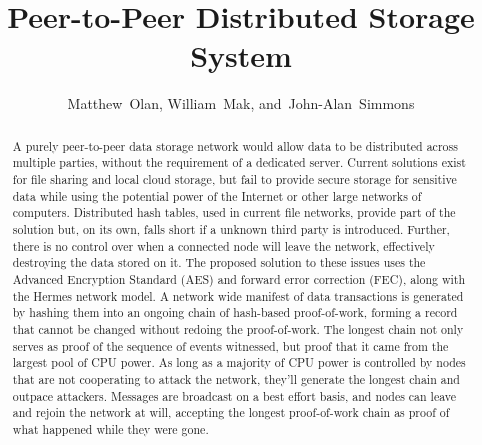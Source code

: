 \documentclass[journal]{IEEEtran}
\begin{document}
\title{Peer-to-Peer Distributed Storage System}

\author{
        Matthew~Olan, %
        William~Mak,
        and~John-Alan~Simmons
}


\maketitle

\begin{abstract} %
A purely peer-to-peer data storage network would allow data to be distributed across multiple parties, without the requirement of a dedicated server. Current solutions exist for file sharing and local cloud storage, but fail to provide secure storage for sensitive data while using the potential power of the Internet or other large networks of computers. Distributed hash tables, used in current file networks, provide part of the solution but, on its own, falls short if a unknown third party is introduced. Further, there is no control over when a connected node will leave the network, effectively destroying the data stored on it. The proposed solution to these issues uses the Advanced Encryption Standard (AES) and forward error correction (FEC), along with the Hermes network model. A network wide manifest of data transactions is generated by hashing them into an ongoing chain of hash-based proof-of-work, forming a record that cannot be changed without redoing the proof-of-work. The longest chain not only serves as proof of the sequence of events witnessed, but proof that it came from the largest pool of CPU power. As long as a majority of CPU power is controlled by nodes that are not cooperating to attack the network, they'll generate the longest chain and outpace attackers. Messages are broadcast on a best effort basis, and nodes can leave and rejoin the network at will, accepting the longest proof-of-work chain as proof of what happened while they were gone.
\end{abstract}

\IEEEpeerreviewmaketitle
\end{document}
